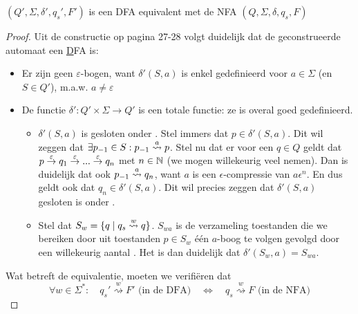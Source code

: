 \documentclass[../aanvullingen_cursus.tex]{subfiles}
\begin{document}
\begin{stelling}
	\( (Q',\Sigma, \delta', q_s',F') \) is een DFA equivalent met de NFA \((Q,\Sigma,\delta,q_s,F)\)
\end{stelling}

\begin{proof}
	Uit de constructie op pagina 27-28 volgt duidelijk dat de geconstrueerde automaat een \underline{D}FA is:
	\begin{itemize}
		\item Er zijn geen \( \varepsilon \)-bogen, want \( \delta'(S,a) \) is enkel gedefinieerd voor \( a \in \Sigma \) (en \( S\in Q' \)), m.a.w. \( a\neq \varepsilon \)
		\item De functie \( \delta':Q' \times \Sigma \to Q' \) is een totale functie: ze is overal goed gedefinieerd.
		\begin{itemize}
			\item \(\delta'(S,a)\) is gesloten onder \epsilonbogen. Stel immers dat \(p \in \delta'(S,a)\). Dit wil zeggen dat \(\exists p_{-1} \in S : p_{-1}\overset{a}{\rightsquigarrow}p\). Stel nu dat er voor een \(q\in Q\) geldt dat \(p\overset{\varepsilon}{\rightarrow}q_1\overset{\varepsilon}{\rightarrow}...\overset{\varepsilon}{\rightarrow}q_n\) met \(n\in \mathbb{N}\) (we mogen willekeurig veel \epsilonbogens nemen). Dan is duidelijk dat ook \(p_{-1}\overset{a}{\rightsquigarrow}q_n\), want \(a\) is een \(\epsilon\)-compressie van \(a\epsilon^n\). En dus geldt ook dat \(q_n \in \delta'(S,a)\). Dit wil precies zeggen dat \(\delta'(S,a)\) gesloten is onder \epsilonbogen.
			\item Stel dat \(S_w=\{q \mid q_s \overset{w}{\rightsquigarrow} q\}\). \(S_{wa}\) is de verzameling toestanden die we bereiken door uit toestanden \(p \in S_w\) één \(a\)-boog te volgen gevolgd door een willekeurig aantal \epsilonbogen. Het is dan duidelijk dat  \(\delta'(S_w,a)=S_{wa}\).
		\end{itemize}
	\end{itemize}

	Wat betreft de equivalentie, moeten we verifiëren dat \[ \forall w \in \Sigma^*: \quad q_s' \overset{w}{\rightsquigarrow} F'  \text{ (in de DFA)} \quad \Longleftrightarrow \quad q_s \overset{w}{\rightsquigarrow} F \text{ (in de NFA)}\]


\end{proof}
\end{document}
